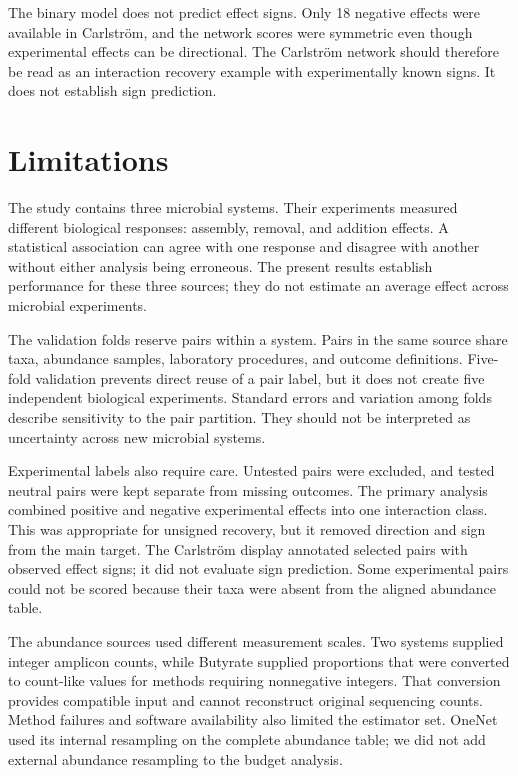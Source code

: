 \documentclass[11pt]{article}
\begin{document}
The binary model does not predict effect signs.
Only 18 negative effects were available in Carlstr\"om, and the network scores were symmetric even though experimental effects can be directional.
The Carlstr\"om network should therefore be read as an interaction recovery example with experimentally known signs.
It does not establish sign prediction.

\section{Limitations}

The study contains three microbial systems.
Their experiments measured different biological responses: assembly, removal, and addition effects.
A statistical association can agree with one response and disagree with another without either analysis being erroneous.
The present results establish performance for these three sources; they do not estimate an average effect across microbial experiments.

The validation folds reserve pairs within a system.
Pairs in the same source share taxa, abundance samples, laboratory procedures, and outcome definitions.
Five-fold validation prevents direct reuse of a pair label, but it does not create five independent biological experiments.
Standard errors and variation among folds describe sensitivity to the pair partition.
They should not be interpreted as uncertainty across new microbial systems.

Experimental labels also require care.
Untested pairs were excluded, and tested neutral pairs were kept separate from missing outcomes.
The primary analysis combined positive and negative experimental effects into one interaction class.
This was appropriate for unsigned recovery, but it removed direction and sign from the main target.
The Carlstr\"om display annotated selected pairs with observed effect signs; it did not evaluate sign prediction.
Some experimental pairs could not be scored because their taxa were absent from the aligned abundance table.

The abundance sources used different measurement scales.
Two systems supplied integer amplicon counts, while Butyrate supplied proportions that were converted to count-like values for methods requiring nonnegative integers.
That conversion provides compatible input and cannot reconstruct original sequencing counts.
Method failures and software availability also limited the estimator set.
OneNet used its internal resampling on the complete abundance table; we did not add external abundance resampling to the budget analysis.
\end{document}

